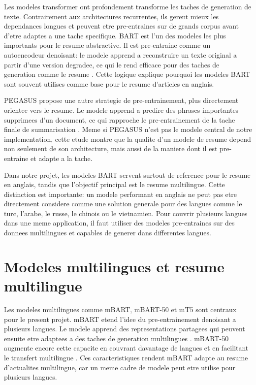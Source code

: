 Les modeles transformer ont profondement transforme les taches de generation de texte. Contrairement aux architectures recurrentes, ils gerent mieux les dependances longues et peuvent etre pre-entraines sur de grands corpus avant d'etre adaptes a une tache specifique. BART est l'un des modeles les plus importants pour le resume abstractive. Il est pre-entraine comme un autoencodeur denoisant: le modele apprend a reconstruire un texte original a partir d'une version degradee, ce qui le rend efficace pour des taches de generation comme le resume \cite{Lewis2020BART}. Cette logique explique pourquoi les modeles BART sont souvent utilises comme base pour le resume d'articles en anglais.

PEGASUS propose une autre strategie de pre-entrainement, plus directement orientee vers le resume. Le modele apprend a predire des phrases importantes supprimees d'un document, ce qui rapproche le pre-entrainement de la tache finale de summarisation \cite{Zhang2020PEGASUS}. Meme si PEGASUS n'est pas le modele central de notre implementation, cette etude montre que la qualite d'un modele de resume depend non seulement de son architecture, mais aussi de la maniere dont il est pre-entraine et adapte a la tache.

Dans notre projet, les modeles BART servent surtout de reference pour le resume en anglais, tandis que l'objectif principal est le resume multilingue. Cette distinction est importante: un modele performant en anglais ne peut pas etre directement considere comme une solution generale pour des langues comme le turc, l'arabe, le russe, le chinois ou le vietnamien. Pour couvrir plusieurs langues dans une meme application, il faut utiliser des modeles pre-entraines sur des donnees multilingues et capables de generer dans differentes langues.

\section{Modeles multilingues et resume multilingue}

Les modeles multilingues comme mBART, mBART-50 et mT5 sont centraux pour le present projet. mBART etend l'idee du pre-entrainement denoisant a plusieurs langues. Le modele apprend des representations partagees qui peuvent ensuite etre adaptees a des taches de generation multilingues \cite{Liu2020mBART}. mBART-50 augmente encore cette capacite en couvrant davantage de langues et en facilitant le transfert multilingue \cite{Tang2020mBART50}. Ces caracteristiques rendent mBART adapte au resume d'actualites multilingue, car un meme cadre de modele peut etre utilise pour plusieurs langues.

